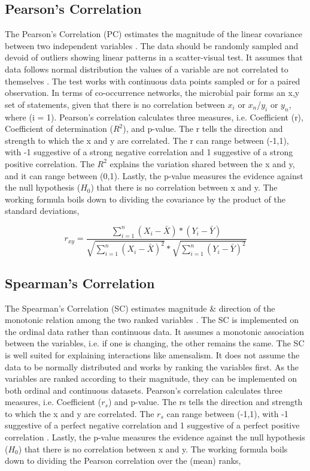 \subsection{Pearson's Correlation}
The Pearson's Correlation (PC) estimates the magnitude of the linear covariance between two independent variables \cite{schober_2018_correlation}. The data should be randomly sampled and devoid of outliers showing linear patterns in a scatter-visual test. It assumes that data follows normal distribution the values of a variable are not correlated to themselves \cite{schober_2018_correlation}. The test works with continuous data points sampled or for a paired observation. In terms of co-occurrence networks, the microbial pair forms an {x,y} set of statements, given that there is no correlation between $x_{i}$ or $x_{n}$/$y_{i}$ or $y_{n}$, where (i = 1). Pearson's correlation calculates three measures, i.e. Coefficient (r), Coefficient of determination ($R^{2}$), and p-value. The r tells the direction and strength to which the x and y are correlated. The r can range between (-1,1), with -1 suggestive of a strong negative correlation and 1 suggestive of a strong positive correlation. The $R^{2}$ explains the variation shared between the x and y, and it can range between (0,1). Lastly, the p-value measures the evidence against the null hypothesis ($H_{0}$) that there is no correlation between x and y. The working formula boils down to dividing the covariance by the product of the standard deviations,

$$r_{xy} = \frac{\sum_{i=1}^{n} (X_{i} - \bar{X}) * (Y_{i} - \bar{Y})}{\sqrt{\sum_{i=1}^{n} (X_{i} - \bar{X})^{2}} * \sqrt{\sum_{i=1}^{n} (Y_{i} - \bar{Y})^{2}}}$$

\subsection{Spearman's Correlation}
The Spearman's Correlation (SC) estimates magnitude \& direction of the monotonic relation among the two ranked variables \cite{dewinter_2016_comparing}. The SC is implemented on the ordinal data rather than continuous data. It assumes a monotonic association between the variables, i.e. if one is changing, the other remains the same. The SC is well suited for explaining interactions like amensalism. It does not assume the data to be normally distributed and works by ranking the variables first. As the variables are ranked according to their magnitude, they can be implemented on both ordinal and continuous datasets. Pearson's correlation calculates three measures, i.e. Coefficient ($r_{s}$) and p-value. The rs tells the direction and strength to which the x and y are correlated. The $r_{s}$ can range between (-1,1), with -1 suggestive of a perfect negative correlation and 1 suggestive of a perfect positive correlation \cite{dewinter_2016_comparing}. Lastly, the p-value measures the evidence against the null hypothesis ($H_{0}$) that there is no correlation between x and y. The working formula boils down to dividing the Pearson correlation over the (mean) ranks,

